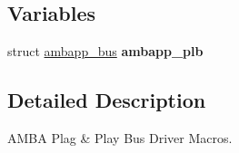 \subsection*{Variables}
\begin{DoxyCompactItemize}
\item 
\mbox{\label{group__RTEMSBSPsSPARCLEON3AMBA_gaebe1fa29572f97b26c2982eb6b094801}} 
struct \mbox{\hyperlink{structambapp__bus}{ambapp\+\_\+bus}} {\bfseries ambapp\+\_\+plb}
\end{DoxyCompactItemize}


\subsection{Detailed Description}
A\+M\+BA Plag \& Play Bus Driver Macros. 

